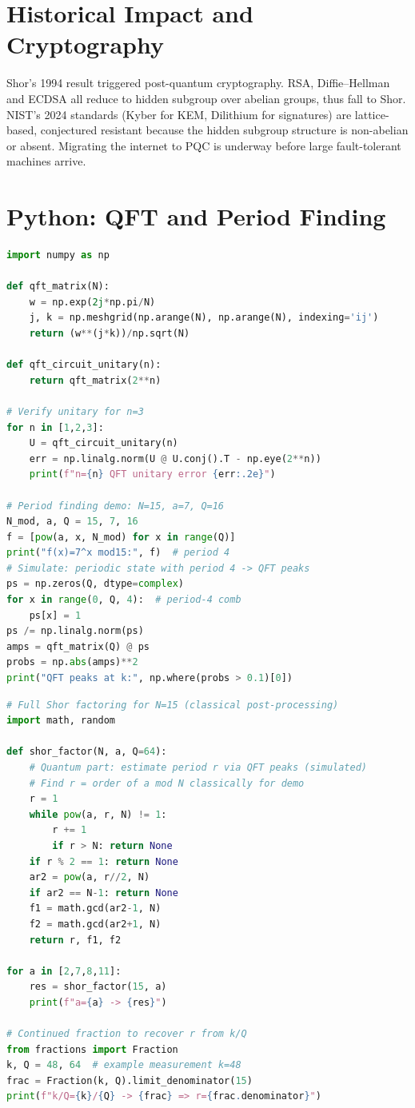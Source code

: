 \section{Historical Impact and Cryptography}
Shor's 1994 result triggered post-quantum cryptography. RSA, Diffie--Hellman and ECDSA all reduce to hidden subgroup over abelian groups, thus fall to Shor. NIST's 2024 standards (Kyber for KEM, Dilithium for signatures) are lattice-based, conjectured resistant because the hidden subgroup structure is non-abelian or absent. Migrating the internet to PQC is underway before large fault-tolerant machines arrive.

\section{Python: QFT and Period Finding}

\begin{lstlisting}[language=Python]
import numpy as np

def qft_matrix(N):
    w = np.exp(2j*np.pi/N)
    j, k = np.meshgrid(np.arange(N), np.arange(N), indexing='ij')
    return (w**(j*k))/np.sqrt(N)

def qft_circuit_unitary(n):
    return qft_matrix(2**n)

# Verify unitary for n=3
for n in [1,2,3]:
    U = qft_circuit_unitary(n)
    err = np.linalg.norm(U @ U.conj().T - np.eye(2**n))
    print(f"n={n} QFT unitary error {err:.2e}")

# Period finding demo: N=15, a=7, Q=16
N_mod, a, Q = 15, 7, 16
f = [pow(a, x, N_mod) for x in range(Q)]
print("f(x)=7^x mod15:", f)  # period 4
# Simulate: periodic state with period 4 -> QFT peaks
ps = np.zeros(Q, dtype=complex)
for x in range(0, Q, 4):  # period-4 comb
    ps[x] = 1
ps /= np.linalg.norm(ps)
amps = qft_matrix(Q) @ ps
probs = np.abs(amps)**2
print("QFT peaks at k:", np.where(probs > 0.1)[0])
\end{lstlisting}

\begin{lstlisting}[language=Python]
# Full Shor factoring for N=15 (classical post-processing)
import math, random

def shor_factor(N, a, Q=64):
    # Quantum part: estimate period r via QFT peaks (simulated)
    # Find r = order of a mod N classically for demo
    r = 1
    while pow(a, r, N) != 1:
        r += 1
        if r > N: return None
    if r % 2 == 1: return None
    ar2 = pow(a, r//2, N)
    if ar2 == N-1: return None
    f1 = math.gcd(ar2-1, N)
    f2 = math.gcd(ar2+1, N)
    return r, f1, f2

for a in [2,7,8,11]:
    res = shor_factor(15, a)
    print(f"a={a} -> {res}")

# Continued fraction to recover r from k/Q
from fractions import Fraction
k, Q = 48, 64  # example measurement k=48
frac = Fraction(k, Q).limit_denominator(15)
print(f"k/Q={k}/{Q} -> {frac} => r={frac.denominator}")
\end{lstlisting}


